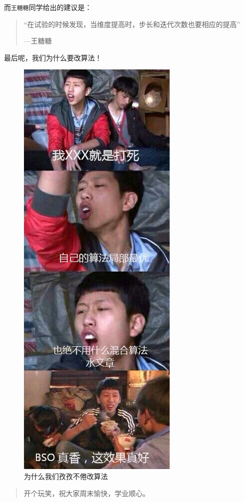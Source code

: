 \documentclass[]{ctexbook}
\theoremstyle{definition}
\theoremstyle{definition}
\theoremstyle{definition}
\theoremstyle{remark}
\begin{document}
而\texttt{王糖糖}同学给出的建议是：

\begin{quote}
``在试验的时候发现，当维度提高时，步长和迭代次数也要相应的提高''

\begin{flushright}---王糖糖\end{flushright}
\end{quote}

最后呢，我们为什么要改算法！

\begin{figure}

{\centering \includegraphics[width=0.5\linewidth]{img/BSO_w} 

}

\caption{为什么我们孜孜不倦改算法}\label{fig:bsow}
\end{figure}

\begin{quote}
开个玩笑，祝大家周末愉快，学业顺心。
\end{quote}
\end{document}
